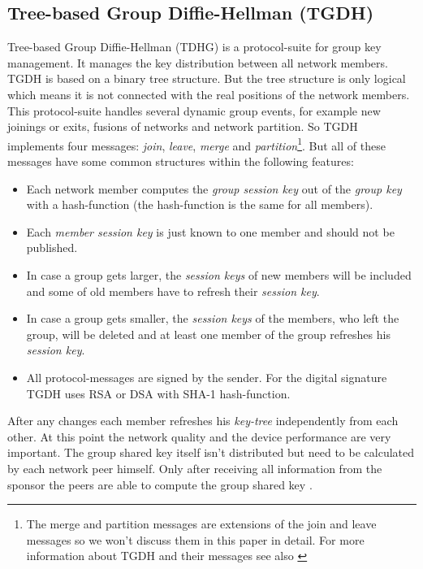 \subsection{Tree-based Group Diffie-Hellman (TGDH)}\label{sec:TGDH}
Tree-based Group Diffie-Hellman (TDHG) is a protocol-suite for group key management. It manages the key distribution between all network members. TGDH is based on a binary tree structure. But the tree structure is only logical which means it is not connected with the real positions of the network members. This protocol-suite handles several dynamic group events, for example new joinings or exits, fusions of networks and network partition. So TGDH implements four messages: \textsl{join}, \textsl{leave}, \textsl{merge} and \textsl{partition}\footnote{The merge and partition messages are extensions of the join and leave messages so we won't discuss them in this paper in detail. For more information about TGDH and their messages see also \cite{Liao2004}}. But all of these messages have some common structures within the following features:
\begin{itemize}
  \item Each network member computes the \textsl{group session key} out of the \textsl{group key} with a hash-function (the hash-function is the same for all members).
  \item Each \textsl{member session key} is just known to one member and should not be published.
  \item In case a group gets larger, the \textsl{session keys} of new members will be included and some of old members have to refresh their \textsl{session key}.
  \item In case a group gets smaller, the \textsl{session keys} of the members, who left the group, will be deleted and at least one member of the group refreshes his \textsl{session key}.
  \item All protocol-messages are signed by the sender. For the digital signature TGDH uses RSA or DSA with SHA-1 hash-function. 
\end{itemize}
After any changes each member refreshes his \textsl{key-tree} independently from each other. At this point the network quality and the device performance are very important. The group shared key itself isn't distributed but need to be calculated by each network peer himself. Only after receiving all information from the sponsor the peers are able to compute the group shared key \cite{Liao2004}.\\

